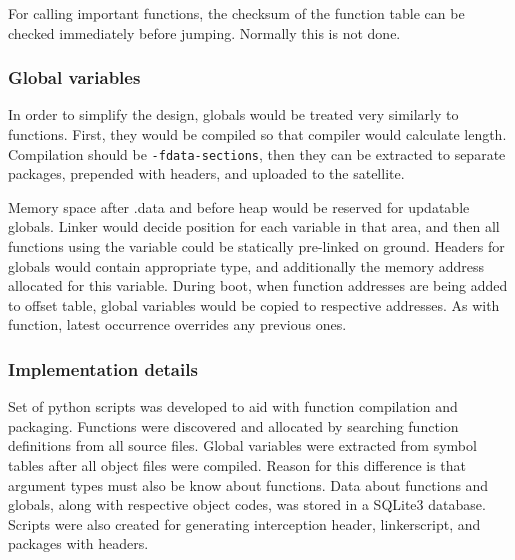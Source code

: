 For calling important functions, the checksum of the function table can be checked immediately before jumping. Normally this is not done.

\subsubsection{Global variables}

In order to simplify the design, globals would be treated very similarly to functions. First, they would be compiled so that compiler would calculate length. Compilation should be \texttt{-fdata-sections}, then they can be extracted to separate packages, prepended with headers, and uploaded to the satellite.

Memory space after .data and before heap would be reserved for updatable globals. Linker would decide position for each variable in that area, and then all functions using the variable could be statically pre-linked on ground. Headers for globals would contain appropriate type, and additionally the memory address allocated for this variable. During boot, when function addresses are being added to offset table, global variables would be copied to respective addresses. As with function, latest occurrence overrides any previous ones.

\subsubsection{Implementation details}

Set of python scripts was developed to aid with function compilation and packaging. Functions were discovered and allocated by searching function definitions from all source files. Global variables were extracted from symbol tables after all object files were compiled. Reason for this difference is that argument types must also be know about functions. Data about functions and globals, along with respective object codes, was stored in a SQLite3 database. Scripts were also created for generating interception header, linkerscript, and packages with headers.
